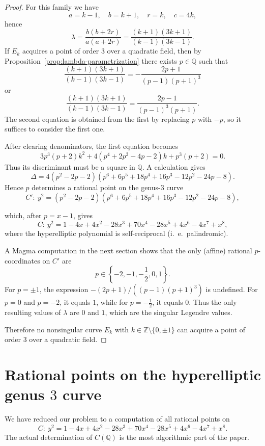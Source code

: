 \documentclass{article}
\theoremstyle{plain}
\newcommand{\Z}{\mathbb{Z}}
\newcommand{\Q}{\mathbb{Q}}
\begin{document}
\begin{proof}
For this family we have
\[
a=k-1,\quad b=k+1,\quad r=k,\quad c=4k,
\]
hence
\[
\lambda=\frac{b(b+2r)}{a(a+2r)}
=\frac{(k+1)(3k+1)}{(k-1)(3k-1)}.
\]
If \(E_k\) acquires a point of order \(3\) over a quadratic field, then by
Proposition~\ref{prop:lambda-parametrization} there exists \(p\in\Q\) such that
\[
\frac{(k+1)(3k+1)}{(k-1)(3k-1)}
=
-\frac{2p+1}{(p-1)(p+1)^3}
\]
or
\[
\frac{(k+1)(3k+1)}{(k-1)(3k-1)}
=
\frac{2p-1}{(p-1)^3(p+1)}.
\]
The second equation is obtained from the first by replacing \(p\) with \(-p\),
so it suffices to consider the first one.

After clearing denominators, the first equation becomes
\[
3p^3(p+2)k^2+4(p^4+2p^3-4p-2)k+p^3(p+2)=0.
\]
Thus its discriminant must be a square in \(\Q\). A calculation gives
\[
\Delta
=
4(p^2-2p-2)(p^6+6p^5+18p^4+16p^3-12p^2-24p-8).
\]
Hence \(p\) determines a rational point on the genus-\(3\) curve
\[
C':\ y^2=(p^2-2p-2)(p^6+6p^5+18p^4+16p^3-12p^2-24p-8),
\]

which, after $p=x-1$, gives 
\[
C:\ y^2= 1 - 4 x + 4 x^2 - 28 x^3 + 70 x^4 - 28 x^5 + 4 x^6 - 4 x^7 + x^8,
\]
where the hyperelliptic polynomial is self-reciprocal (i.~e.~palindromic). %

A Magma computation in the next section shows that the only (affine) rational \(p\)-coordinates on \(C'\) are
\[
p\in\left\{-2,-1,-\frac12,0,1\right\}.
\]
For \(p=\pm1\), the expression
\(
-(2p+1)/((p-1)(p+1)^3)
\)
is undefined. For \(p=0\) and \(p=-2\), it equals \(1\), while for
\(p=-\frac12\), it equals \(0\). Thus the only resulting values of \(\lambda\)
are \(0\) and \(1\), which are the singular Legendre values.

Therefore no nonsingular curve \(E_k\) with \(k\in\Z\setminus\{0,\pm1\}\) can
acquire a point of order \(3\) over a quadratic field.
\end{proof}

\section{Rational points on the hyperelliptic genus \texorpdfstring{$3$}{3} curve}

We have reduced our problem to a computation of all rational points on
\[
C:\ y^2= 1 - 4 x + 4 x^2 - 28 x^3 + 70 x^4 - 28 x^5 + 4 x^6 - 4 x^7 + x^8.
\]
The actual determination of $C(\Q)$ is the most algorithmic part of the paper. 
\end{document}
